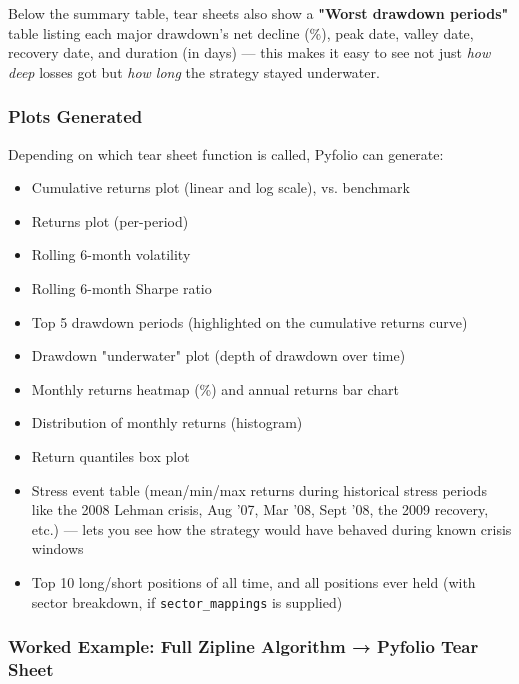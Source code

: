 \documentclass[12pt,openany]{book}
\theoremstyle{definition}
\theoremstyle{remark}
\begin{document}
Below the summary table, tear sheets also show a \textbf{"Worst drawdown periods"} table listing each major drawdown's net decline (\%), peak date, valley date, recovery date, and duration (in days) — this makes it easy to see not just \emph{how deep} losses got but \emph{how long} the strategy stayed underwater.
\subsubsection{Plots Generated}

Depending on which tear sheet function is called, Pyfolio can generate:

\begin{itemize}
\item 
Cumulative returns plot (linear and log scale), vs. benchmark

\item 
Returns plot (per-period)

\item 
Rolling 6-month volatility

\item 
Rolling 6-month Sharpe ratio

\item 
Top 5 drawdown periods (highlighted on the cumulative returns curve)

\item 
Drawdown "underwater" plot (depth of drawdown over time)

\item 
Monthly returns heatmap (\%) and annual returns bar chart

\item 
Distribution of monthly returns (histogram)

\item 
Return quantiles box plot

\item 
Stress event table (mean/min/max returns during historical stress periods like the 2008 Lehman crisis, Aug '07, Mar '08, Sept '08, the 2009 recovery, etc.) — lets you see how the strategy would have behaved during known crisis windows

\item 
Top 10 long/short positions of all time, and all positions ever held (with sector breakdown, if \texttt{sector\_mappings} is supplied)

\end{itemize}
\subsubsection{Worked Example: Full Zipline Algorithm → Pyfolio Tear Sheet}
\end{document}
